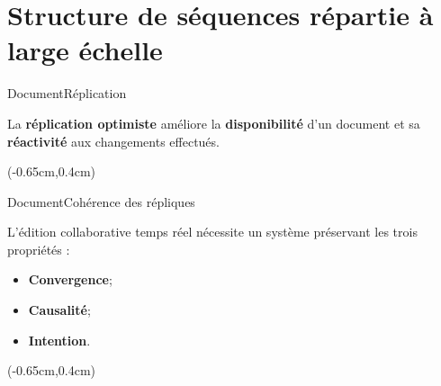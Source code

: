 \section{Structure de séquences répartie à large échelle}


\begin{frame}{Document}{Réplication}
  \vspace{-1.5cm}

  La \textbf{réplication optimiste} améliore
  la \textbf{disponibilité} d'un document et sa \textbf{réactivité} aux
  changements effectués.  \vspace{0.75cm}


  \begin{textblock*}{\textwidth}(-0.65cm,0.4cm) 
    
  \end{textblock*}
  
  \vspace{1cm}

\end{frame}


\begin{frame}{Document}{Cohérence des répliques}
  
  \vspace{-1.5cm}

  L'édition collaborative temps réel nécessite un système préservant les trois
  propriétés :

  \begin{itemize}
  \item \textbf{Convergence};
  \item \textbf{Causalité};
  \item \textbf{Intention}.  
  \end{itemize}

  \begin{textblock*}{\textwidth}(-0.65cm,0.4cm) 
    
  \end{textblock*}

\end{frame}


